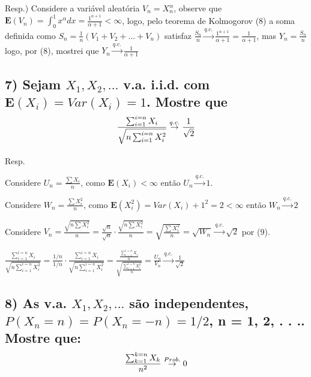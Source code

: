 \documentclass[portuguese]{article}
\begin{document}
Resp.) Considere a variável aleatória $V_{n}=X_{n}^{\alpha}$, observe
que $\mathbf{E}(V_{n})=\int_{0}^{1}x^{\alpha}dx=\frac{1^{\alpha+1}}{\alpha+1}<\infty$,
logo, pelo teorema de Kolmogorov (8) a soma definida como $S_{n}=\frac{1}{n}(V_{1}+V_{2}+...+V_{n})$
satisfaz $\frac{S_{n}}{n}\overset{q.c.}{\to}\frac{1^{\alpha+1}}{\alpha+1}=\frac{1}{\alpha+1}$,
mas $Y_{n}=\frac{S_{n}}{n}$ logo, por (8), mostrei que $Y_{n}\overset{q.c.}{\to}\frac{1}{\alpha+1}$


\subsection*{\textcompwordmark{}}


\subsection*{\textmd{7) Sejam $X_{1},X_{2},...$ v.a. i.i.d. com $\mathbf{E}(X_{i})=Var(X_{i})=1$.
Mostre que 
\[
\frac{\sum_{i=1}^{i=n}X_{i}}{\sqrt{n\sum_{i=1}^{i=n}X_{i}^{2}}}\protect\overset{q.c.}{\to}\frac{1}{\sqrt{2}}
\]
}}

Resp. 

Considere $U_{n}=\frac{\sum X_{i}}{n}$, como $\mathbf{E}(X_{i})<\infty$
então $U_{n}\overset{q.c.}{\to}1$.

Considere $W_{n}=\frac{\sum X_{i}^{2}}{n}$, como $\mathbf{E}(X_{i}^{2})=Var(X_{i})+1^{2}=2<\infty$
então $W_{n}\overset{q.c.}{\to}2$

Considere $V_{n}=\frac{\sqrt{n\sum X_{i}^{2}}}{n}=\frac{\sqrt{n}}{\sqrt{n}}\cdot\frac{\sqrt{n\sum X_{i}^{2}}}{n}=\sqrt{\frac{\sum X_{i}^{2}}{n}}=\sqrt{W_{n}}\overset{q.c.}{\to}\sqrt{2}$
por (9).

$\frac{\sum_{i=1}^{i=n}X_{i}}{\sqrt{n\sum_{i=1}^{i=n}X_{i}^{2}}}=\frac{1/n}{1/n}\cdot\frac{\sum_{i=1}^{i=n}X_{i}}{\sqrt{n\sum_{i=1}^{i=n}X_{i}^{2}}}=\frac{\frac{\sum_{i=1}^{i=n}X_{i}}{n}}{\sqrt{\frac{\sum_{i=1}^{i=n}X_{i}^{2}}{n}}}=\frac{U_{n}}{V_{n}}\overset{q.c.}{\to}\frac{1}{\sqrt{2}}$


\subsection*{\textcompwordmark{}}


\subsection*{\textmd{8) As v.a. $X_{1},X_{2},...$ são independentes, $P(X_{n}=n)=P(X_{n}=-n)=1/2$,
n = 1, 2, . . .. Mostre que:
\[
\frac{\sum_{k=1}^{k=n}X_{k}}{n^{2}}\protect\overset{Prob.}{\to}0
\]
}}
\end{document}
